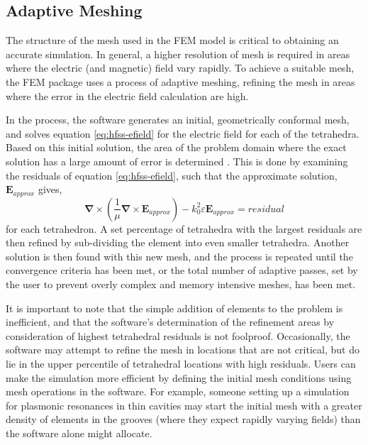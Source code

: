 \subsection{Adaptive Meshing}

The structure of the mesh used in the FEM model is critical to obtaining an accurate simulation. In general, a higher resolution of mesh is required in areas where the electric (and magnetic) field vary rapidly. To achieve a suitable mesh, the FEM package uses a process of adaptive meshing, refining the mesh in areas where the error in the electric field calculation are high.

In the process, the software generates an initial, geometrically conformal mesh, and solves equation \ref{eq:hfss-efield} for the electric field for each of the tetrahedra. Based on this initial solution, the area of the problem domain where the exact solution has a large amount of error is determined \cite{Kopp2009}. This is done by examining the residuals of equation \ref{eq:hfss-efield}, such that the approximate solution, $\mathbf{E}_{approx}$ gives,
\begin{equation}
	\mathbf{\nabla} \times \left( \frac{1}{\mu} \mathbf{\nabla} \times 	\mathbf{E}_{approx} \right) -k_0^2 \varepsilon \mathbf{E}_{approx} = residual
\end{equation}
for each tetrahedron. A set percentage of tetrahedra with the largest residuals are then refined by sub-dividing the element into even smaller tetrahedra. Another solution is then found with this new mesh, and the process  is repeated until the convergence criteria has been met, or the total number of adaptive passes, set by the user to prevent overly complex and memory intensive meshes, has been met.

It is important to note that the simple addition of elements to the problem is inefficient, and that the software's determination of the refinement areas by consideration of highest tetrahedral residuals is not foolproof. Occasionally, the software may attempt to refine the mesh in locations that are not critical, but do lie in the upper percentile of tetrahedral locations with high residuals. Users can make the simulation more efficient by defining the initial mesh conditions using mesh operations in the software. For example, someone setting up a simulation for plasmonic resonances in thin cavities may start the initial mesh with a greater density of elements in the grooves (where they expect rapidly varying fields) than the software alone might allocate.


